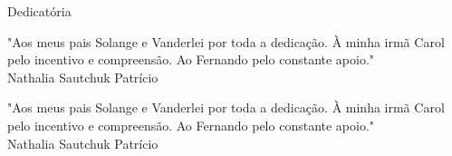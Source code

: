 
\begin{titlepage}
  \begin{center}
    {\ABNTchaptersize\ABNTchapterfont Dedicatória}
  \end{center}

  \begin{flushright}

  \vspace*{\fill}

    "Aos meus pais Solange e Vanderlei por toda a dedicação. À minha irmã Carol pelo incentivo e compreensão. Ao Fernando pelo constante apoio." \\ Nathalia Sautchuk Patrício

  \vspace*{\fill}

    "Aos meus pais Solange e Vanderlei por toda a dedicação. À minha irmã Carol pelo incentivo e compreensão. Ao Fernando pelo constante apoio." \\ Nathalia Sautchuk Patrício

  \vspace*{\fill}

  \end{flushright}

\end{titlepage}
